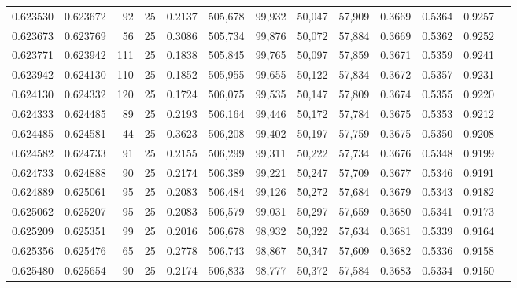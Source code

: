 \begin{tabular}{rrrrrrrrrrrrr}
0.623530 & 0.623672 &    92 &  25 &                                     0.2137 & 505,678 &  99,932 &  50,047 &  57,909 & 0.3669 & 0.5364 & 0.9257 \\
0.623673 & 0.623769 &    56 &  25 &                                     0.3086 & 505,734 &  99,876 &  50,072 &  57,884 & 0.3669 & 0.5362 & 0.9252 \\
0.623771 & 0.623942 &   111 &  25 &                                     0.1838 & 505,845 &  99,765 &  50,097 &  57,859 & 0.3671 & 0.5359 & 0.9241 \\
0.623942 & 0.624130 &   110 &  25 &                                     0.1852 & 505,955 &  99,655 &  50,122 &  57,834 & 0.3672 & 0.5357 & 0.9231 \\
0.624130 & 0.624332 &   120 &  25 &                                     0.1724 & 506,075 &  99,535 &  50,147 &  57,809 & 0.3674 & 0.5355 & 0.9220 \\
0.624333 & 0.624485 &    89 &  25 &                                     0.2193 & 506,164 &  99,446 &  50,172 &  57,784 & 0.3675 & 0.5353 & 0.9212 \\
0.624485 & 0.624581 &    44 &  25 &                                     0.3623 & 506,208 &  99,402 &  50,197 &  57,759 & 0.3675 & 0.5350 & 0.9208 \\
0.624582 & 0.624733 &    91 &  25 &                                     0.2155 & 506,299 &  99,311 &  50,222 &  57,734 & 0.3676 & 0.5348 & 0.9199 \\
0.624733 & 0.624888 &    90 &  25 &                                     0.2174 & 506,389 &  99,221 &  50,247 &  57,709 & 0.3677 & 0.5346 & 0.9191 \\
0.624889 & 0.625061 &    95 &  25 &                                     0.2083 & 506,484 &  99,126 &  50,272 &  57,684 & 0.3679 & 0.5343 & 0.9182 \\
0.625062 & 0.625207 &    95 &  25 &                                     0.2083 & 506,579 &  99,031 &  50,297 &  57,659 & 0.3680 & 0.5341 & 0.9173 \\
0.625209 & 0.625351 &    99 &  25 &                                     0.2016 & 506,678 &  98,932 &  50,322 &  57,634 & 0.3681 & 0.5339 & 0.9164 \\
0.625356 & 0.625476 &    65 &  25 &                                     0.2778 & 506,743 &  98,867 &  50,347 &  57,609 & 0.3682 & 0.5336 & 0.9158 \\
0.625480 & 0.625654 &    90 &  25 &                                     0.2174 & 506,833 &  98,777 &  50,372 &  57,584 & 0.3683 & 0.5334 & 0.9150 \\

\end{tabular}
